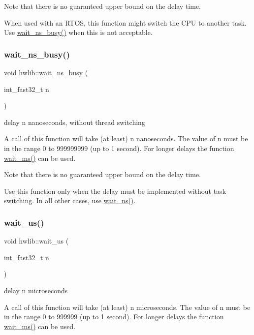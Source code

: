 Note that there is no guaranteed upper bound on the delay time.

When used with an R\+T\+OS, this function might switch the C\+PU to another task. Use \hyperlink{namespacehwlib_a7f8f4b0176df290091ac1d2cbaede23b}{wait\+\_\+ns\+\_\+busy()} when this is not acceptable. \mbox{\label{namespacehwlib_a7f8f4b0176df290091ac1d2cbaede23b}} 
\subsubsection{\texorpdfstring{wait\+\_\+ns\+\_\+busy()}{wait\_ns\_busy()}}
{\footnotesize\ttfamily void hwlib\+::wait\+\_\+ns\+\_\+busy (\begin{DoxyParamCaption}\item[{int\+\_\+fast32\+\_\+t}]{n }\end{DoxyParamCaption})}

delay n nanoseconds, without thread switching

A call of this function will take (at least) n nanoseconds. The value of n must be in the range 0 to 999999999 (up to 1 second). For longer delays the function \hyperlink{namespacehwlib_a6119aa5d3034176aa1515ef4bb193044}{wait\+\_\+ms()} can be used.

Note that there is no guaranteed upper bound on the delay time.

Use this function only when the delay must be implemented without task switching. In all other cases, use \hyperlink{namespacehwlib_a9c01a1d0319f5eadd8926e66aea19aa0}{wait\+\_\+ns()}. \mbox{\label{namespacehwlib_a0096b739fc566c896366ecbd3113cc1e}} 
\subsubsection{\texorpdfstring{wait\+\_\+us()}{wait\_us()}}
{\footnotesize\ttfamily void hwlib\+::wait\+\_\+us (\begin{DoxyParamCaption}\item[{int\+\_\+fast32\+\_\+t}]{n }\end{DoxyParamCaption})}

delay n microseconds

A call of this function will take (at least) n microseconds. The value of n must be in the range 0 to 999999 (up to 1 second). For longer delays the function \hyperlink{namespacehwlib_a6119aa5d3034176aa1515ef4bb193044}{wait\+\_\+ms()} can be used.

